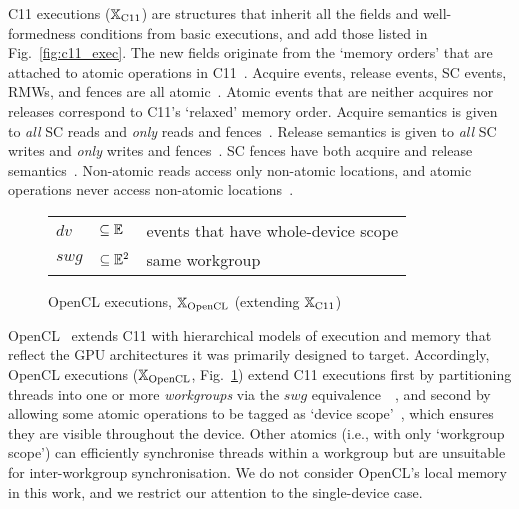 \begin{definition}[C11 executions] C11 executions ($\mathbb{X}_{\rm C11}$) are
structures that inherit all the fields and well-formedness conditions
from basic executions, and add those listed in
Fig.~\ref{fig:c11_exec}. The new fields originate from the `memory
orders' that are attached to atomic operations in
C11~\cite[§7.17.3]{c11}. Acquire events, release events, SC events,
RMWs, and fences are all atomic~. Atomic events
that are neither acquires nor releases correspond to C11's `relaxed'
memory order. Acquire semantics
is given to \emph{all} SC reads and \emph{only} reads and
fences~. Release semantics is given to \emph{all}
SC writes and \emph{only} writes and fences~. SC
fences have both acquire and release semantics~.
Non-atomic reads access only non-atomic locations, and atomic
operations never access non-atomic locations~.
\end{definition}

\begin{figure}[t]
\begin{tabular}{@{}l@{~}l@{~~~~~~~~}l}
$dv$ & $\subseteq \mathbb{E}$ & events that have whole-device scope \\
$swg$ & $\subseteq \mathbb{E}^2$ & same workgroup \\
\end{tabular}
\par\vspace*{-2mm}
\caption{OpenCL executions, $\mathbb{X}_{\rm OpenCL}$ (extending $\mathbb{X}_{\rm C11}$)}
\label{fig:opencl_exec}
\end{figure}

\begin{definition} 
%
OpenCL~\cite{opencl20} extends C11 with hierarchical models of
execution and memory that reflect the GPU architectures it was
primarily designed to target. Accordingly, OpenCL executions
($\mathbb{X}_{\rm OpenCL}$, Fig.~\ref{fig:opencl_exec}) extend C11 executions
first by partitioning threads into one or more \emph{workgroups} via
the $swg$
equivalence~~,
and second by allowing some atomic operations to be tagged as `device
scope'~, which ensures they are visible
throughout the device. Other atomics (i.e., with only `workgroup
scope') can efficiently synchronise threads within a workgroup but
are unsuitable for inter-workgroup synchronisation. We do not
consider OpenCL's local memory in this work, and we restrict our
attention to the single-device case.
%
\end{definition}

